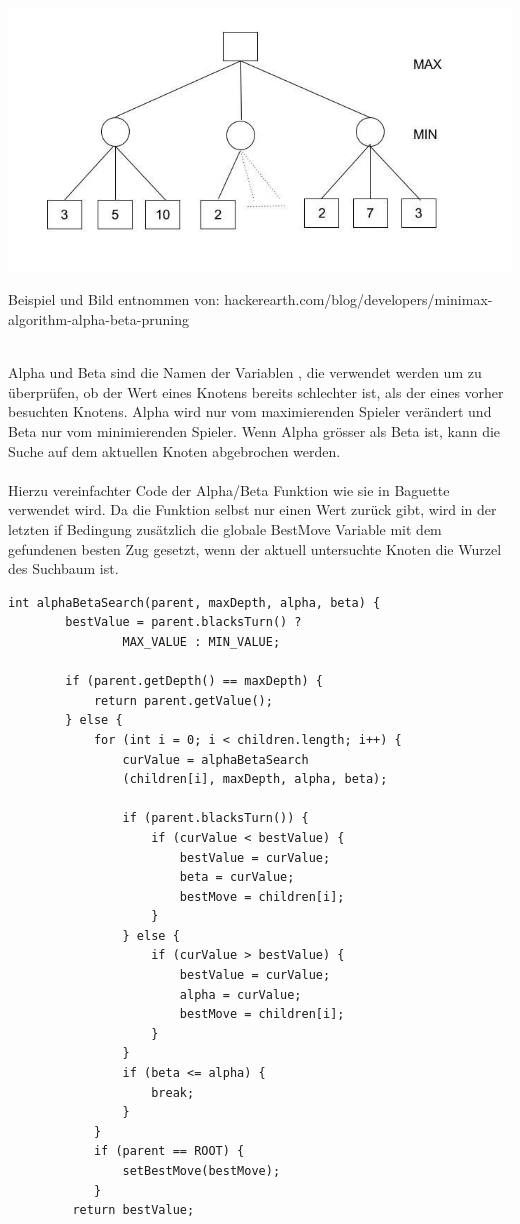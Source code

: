 \includegraphics[scale=0.5]{alpha-beta-pruning.jpg}\\
\begin{tiny}
Beispiel und Bild entnommen von: hackerearth.com/blog/developers/minimax-algorithm-alpha-beta-pruning
\end{tiny}\\
Alpha und Beta sind die Namen der Variablen , die verwendet werden um zu \"uberpr\"ufen, ob der Wert eines Knotens bereits schlechter ist, als der eines vorher besuchten Knotens.
Alpha wird nur vom maximierenden Spieler ver\"andert und Beta nur vom minimierenden Spieler.
Wenn Alpha gr\"osser als Beta ist, kann die Suche auf dem aktuellen Knoten abgebrochen werden.
\\\\
Hierzu vereinfachter Code der Alpha/Beta Funktion wie sie in Baguette verwendet wird.
Da die Funktion selbst nur einen Wert zur\"uck gibt, wird in der letzten if Bedingung zus\"atzlich die globale BestMove Variable mit dem gefundenen besten Zug gesetzt, wenn der aktuell untersuchte Knoten die Wurzel des Suchbaum ist.
\newline
\begin{lstlisting}[frame=single]
int alphaBetaSearch(parent, maxDepth, alpha, beta) {
        bestValue = parent.blacksTurn() ?
                MAX_VALUE : MIN_VALUE;

        if (parent.getDepth() == maxDepth) {
            return parent.getValue();
        } else {
            for (int i = 0; i < children.length; i++) {
                curValue = alphaBetaSearch
                (children[i], maxDepth, alpha, beta);

                if (parent.blacksTurn()) {
                    if (curValue < bestValue) {
                        bestValue = curValue;
                        beta = curValue;
                        bestMove = children[i];
                    }
                } else {
                    if (curValue > bestValue) {
                        bestValue = curValue;
                        alpha = curValue;
                        bestMove = children[i];
                    }
                }
                if (beta <= alpha) {
                    break;
                }
            }
            if (parent == ROOT) {
                setBestMove(bestMove);
            }
         return bestValue;
\end{lstlisting}

